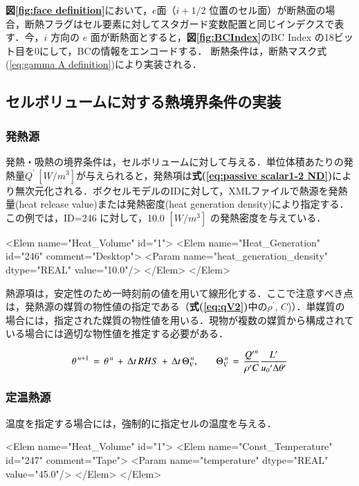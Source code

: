 \textbf{図\ref{fig:face definition}}において，$e$面（$i+1/2$ 位置のセル面）が断熱面の場合，断熱フラグはセル要素に対してスタガード変数配置と同じインデクスで表す．今，$i$ 方向の $e$ 面が断熱面とすると，\textbf{図\ref{fig:BCIndex}}のBC Index の18ビット目を0にして，BCの情報をエンコードする．
断熱条件は，断熱マスク式(\ref{eq:gamma A definition})により実装される．


%
\subsection{セルボリュームに対する熱境界条件の実装}
\label{sec:volume heat bc}
%
\subsubsection{発熱源}
発熱・吸熱の境界条件は，セルボリュームに対して与える．単位体積あたりの発熱量$Q^\prime \,[W/m^3]$が与えられると，発熱項は\textbf{式(\ref{eq:passive scalar1-2 ND})}により無次元化される．ボクセルモデルのIDに対して，XMLファイルで熱源を発熱量(heat release value)または発熱密度(heat generation density)により指定する．この例では，ID=246 に対して，10.0 $[W/m^3]$ の発熱密度を与えている．
{
\small
\begin{program}
<Elem name="Heat_Volume" id="1">
  <Elem name="Heat_Generation" id="246" comment="Desktop">
    <Param name="heat_generation_density" dtype="REAL" value="10.0"/>
  </Elem>
</Elem>
\end{program}
}

熱源項は，安定性のため一時刻前の値を用いて線形化する．ここで注意すべき点は，発熱源の媒質の物性値の指定である（\textbf{式(\ref{eq:qV2})}中の$\rho^{\prime},\,C$)）．単媒質の場合には，指定された媒質の物性値を用いる．現物が複数の媒質から構成されている場合には適切な物性値を推定する必要がある．

\begin{equation}
{\mathit{\theta}}^{\hspace{0.15em}n+1}\,=\,{\mathit{\theta}}^{\hspace{0.15em}n}\,+\,\Delta t\,RHS\,+\,\mathrm{\Delta}{t}\,{\mathrm{\Theta}}_{V}^{\hspace{0.15em}n}{\mathrm{,}}
\qquad
{\mathrm{\Theta}}_{V}^{\hspace{0.15em}n}\,=\,\frac{{Q^{\prime}}^{n}}{{\mathit{\rho}}'C}\frac{L^{\prime}}{{u_{\mathit{0}}}^{\prime}\Delta \theta^{\prime}}
\label{eq:qV2}
\end{equation}

%
\subsubsection{定温熱源}
温度を指定する場合には，強制的に指定セルの温度を与える．
{
\small
\begin{program}
<Elem name="Heat_Volume" id="1">
  <Elem name="Const_Temperature" id="247" comment="Tape">
    <Param name="temperature" dtype="REAL" value="45.0"/>
  </Elem>
</Elem>
\end{program}
}


